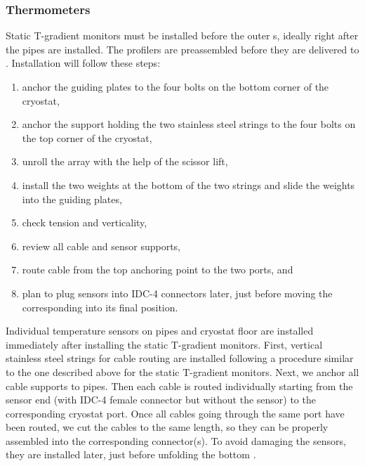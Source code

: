 \subsubsection{Thermometers}
\label{sec:fdgen-slow-cryo-install-th}

Static T-gradient monitors %
must be installed before the outer s, ideally %
right after the pipes are installed. The profilers %
are preassembled before they are delivered to \surf. 
Installation will follow these steps:
\begin{enumerate}
\item anchor the guiding plates to the four bolts on the bottom corner of the cryostat,
\item anchor the support holding the two stainless steel strings to the four bolts on the top corner of the cryostat,
\item unroll the array with the help of the scissor lift,
\item install the two weights at the bottom of the two strings and slide the weights into the guiding plates, 
\item check tension and verticality,
\item review all cable and sensor supports, 
\item route cable from the top anchoring point to the two  ports, and 
\item plan to plug sensors into IDC-4 connectors later, just before moving the corresponding  into its final position. 
\end{enumerate}

Individual temperature sensors on pipes and cryostat floor %
are installed immediately after installing the static T-gradient monitors. First, vertical stainless steel strings for cable routing %
are installed following a procedure similar to the one described above for the static T-gradient monitors. Next, we anchor all cable supports to pipes. Then each cable %
is routed individually starting from the sensor end (with IDC-4 female connector but without the sensor)
to the corresponding cryostat port. Once all cables going through the same port have been routed, we cut the cables to the same length, so they can be properly assembled into the corresponding connector(s). To avoid damaging the sensors, they are installed later, just before unfolding the bottom .

